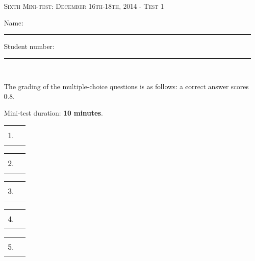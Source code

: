 \documentclass{docist}
\begin{document}
\thispagestyle{empty}

\begin{center}
  {\Large \textsc{Sixth Mini-test: December 16th-18th, 2014 - Test 1\\[2ex]}}
  {\normalsize    Name: \rule{8cm}{1pt} Student number: \rule{2cm}{1pt}\\[2ex]}
\end{center}

The grading of the multiple-choice questions is as follows: a correct answer scores 0.8.


Mini-test duration: \textbf{10 minutes}. 

\begin{center}
%
  \begin{tabular}{rc}
    1. & \rule{1cm}{1pt} \\[2ex]
  \end{tabular}
  \hspace*{0.7cm}
  \begin{tabular}{rc}
    2. & \rule{1cm}{1pt} \\[2ex]
  \end{tabular}
  \hspace*{0.7cm}
  \begin{tabular}{rc}
    3. & \rule{1cm}{1pt} \\[2ex]
  \end{tabular}
  \hspace*{0.7cm}
  \begin{tabular}{rc}
    4. & \rule{1cm}{1pt} \\[2ex]
  \end{tabular}
  \hspace*{0.7cm}
  \begin{tabular}{rc}
    5. & \rule{1cm}{1pt} \\[2ex]
  \end{tabular}
\end{center}




\qSilkMobileDevices

\qThousandParsecReadWriteConnector

\qOrderPadReliability

\qSocialCalcConflictResolution

\qLogicAccessTableModule
\end{document}
